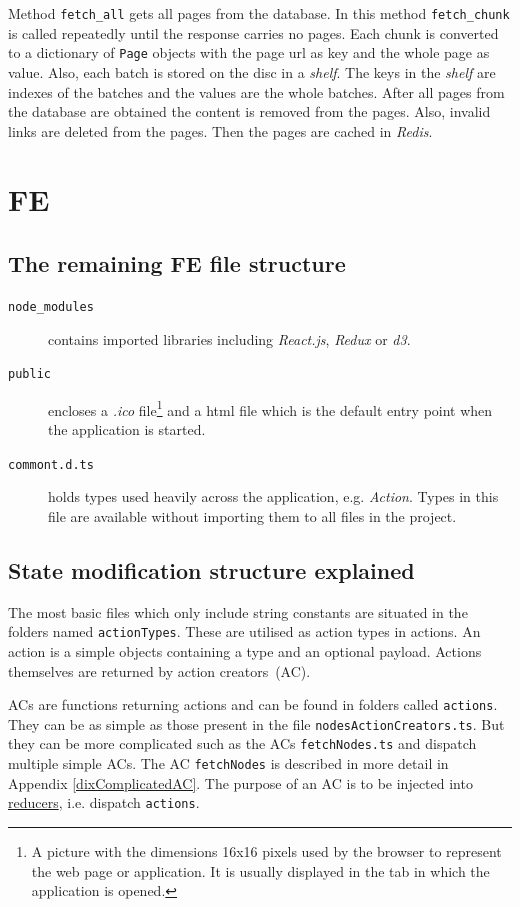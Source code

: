 Method \texttt{fetch\_all} gets all pages from the database. In this method \texttt{fetch\_chunk} is called repeatedly until the response carries no pages. Each chunk is converted to a dictionary of \texttt{Page} objects with the page url as key and the whole page as value. Also, each batch is stored on the disc in a \textit{shelf}. The keys in the \textit{shelf} are indexes of the batches and the values are the whole batches. After all pages from the database are obtained the content is removed from the pages. Also, invalid links are deleted from the pages. Then the pages are cached in \textit{Redis}.

\section{FE}
\subsection{The remaining FE file structure}
\begin{description}
    \item[\texttt{node\_modules}] contains imported libraries including \textit{React.js}, \textit{Redux} or \textit{d3}.
    \item[\texttt{public}] encloses a \textit{.ico} file\footnote {A picture with the dimensions 16x16 pixels used by the browser to represent the web page or application. It is usually displayed in the tab in which the application is opened.} and a html file which is the default entry point when the application is started. 
    \item[\texttt{commont.d.ts}] holds types used heavily across the application, e.g. \textit{Action}. Types in this file are available without importing them to all files in the project.
\end{description}

\subsection{State modification structure explained}\label{dixModifyReduxState}
The most basic files which only include string constants are situated in the folders named \texttt{actionTypes}.  These are utilised as action types in actions. An action is a simple objects containing a type and an optional payload. Actions themselves are returned by action creators~(AC). 

ACs are functions returning actions and can be found in folders called \texttt{actions}. They can be as simple as those present in the file \texttt{nodesActionCreators.ts}. But they can be more complicated such as the ACs \texttt{fetchNodes.ts} and dispatch multiple simple ACs. The AC \texttt{fetchNodes} is described in more detail in Appendix \ref{dixComplicatedAC}. The purpose of an AC is to be injected into \hyperlink{reducers}{reducers}, i.e. dispatch \texttt{actions}. 

